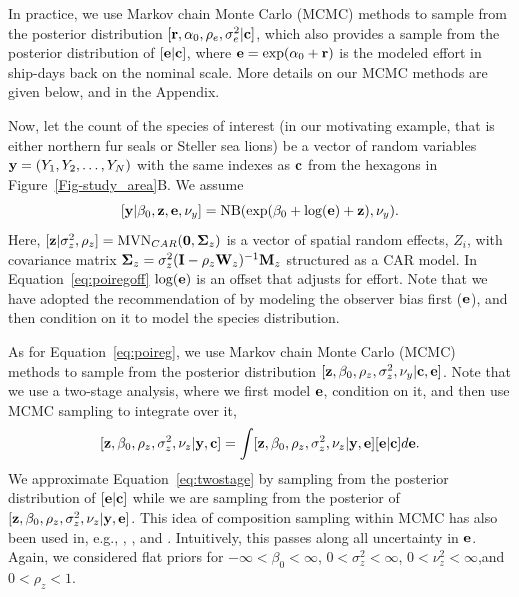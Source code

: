 \documentclass[11pt, titlepage]{article}
\begin{document}
\begin{spacing}{1.9}
\begin{flushleft}
In practice, we use Markov chain Monte Carlo (MCMC) methods to sample from the posterior distribution $[\mathbf{r}, \alpha_{0}, \rho_{e}, \sigma^{2}_{e}|\mathbf{c}]$, which also provides a sample from the posterior distribution of $[\mathbf{e}|\mathbf{c}]$, where $\mathbf{e} = \exp(\alpha_{0} + \mathbf{r})$ is the modeled effort in ship-days back on the nominal scale.  More details on our MCMC methods are given below, and in the Appendix.

Now, let the count of the species of interest (in our motivating example, that is either northern fur seals or Steller sea lions) be a vector of random variables $\mathbf{y} = (Y_{1}, Y_{2}, \ldots, Y_{N})$ with the same indexes as $\mathbf{c}$ from the hexagons in Figure~\ref{Fig-study_area}B.  We assume
\begin{equation} \label{eq:poiregoff}
[\mathbf{y}|\beta_{0},\mathbf{z},\mathbf{e},\nu_{y}] = \textrm{NB}(\exp(\beta_{0} + \textrm{log}(\mathbf{e}) + \mathbf{z}), \nu_{y}).
\end{equation}
Here, $[\mathbf{z}|\sigma^{2}_{z}, \rho_{z}] = \textrm{MVN}_{CAR}(\mathbf{0},\mbox{\boldmath $\Sigma$}_{z})$ is a vector of spatial random effects, $Z_{i}$, with covariance matrix $\mbox{\boldmath $\Sigma$}_{z} = \sigma_{z}^{2}(\mathbf{I} - \rho_{z}\mathbf{W}_{z})^{-1}\mathbf{M}_{z}$ structured as a CAR model.  In Equation~\eqref{eq:poiregoff} $\textrm{log}(\mathbf{e})$ is an offset that adjusts for effort. Note that we have adopted the recommendation of \citet{warton_model-based_2013} by modeling the observer bias first ($\mathbf{e}$), and then condition on it to model the species distribution.

As for Equation~\eqref{eq:poireg}, we use Markov chain Monte Carlo (MCMC) methods to sample from the posterior distribution $[\mathbf{z}, \beta_{0}, \rho_{z}, \sigma^{2}_{z},\nu_{y}|\mathbf{c},\mathbf{e}]$. Note that we use a two-stage analysis, where we first model $\mathbf{e}$, condition on it, and then use MCMC sampling to integrate over it, 
\begin{equation} \label{eq:twostage}
[\mathbf{z}, \beta_{0}, \rho_{z}, \sigma^{2}_{z},\nu_{z}|\mathbf{y},\mathbf{c}] = \int[\mathbf{z}, \beta_{0}, \rho_{z}, \sigma^{2}_{z},\nu_{z}|\mathbf{y},\mathbf{e}][\mathbf{e}|\mathbf{c}]d\mathbf{e}.
\end{equation}
We approximate Equation~\eqref{eq:twostage} by sampling from the posterior distribution of $[\mathbf{e}|\mathbf{c}]$ while we are sampling from the posterior of $[\mathbf{z}, \beta_{0}, \rho_{z}, \sigma^{2}_{z},\nu_{z}|\mathbf{y},\mathbf{e}]$. This idea of composition sampling within MCMC has also been used in, e.g., \citet{BanerjeeEtAl2008Gaussianpredictiveprocess825}, \citet{hooten_agent-based_2010}, and \citet{babcock_lidar_2015}. Intuitively, this passes along all uncertainty in $\mathbf{e}$. Again, we considered flat priors for $-\infty < \beta_{0} < \infty$, $0 < \sigma^{2}_{z} < \infty$, $0 < \nu^{2}_{z} < \infty$,and $0 < \rho_{z} < 1$.


\end{flushleft}
\end{spacing}
\end{document}
